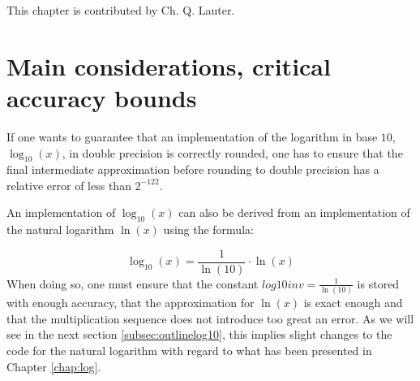 %
%
%
%


This chapter is contributed by Ch. Q. Lauter.

\section{Main considerations, critical accuracy bounds}\label{subsec:criticalboundslog10}
If one wants to guarantee that an implementation of the logarithm in
base $10$, $\log_{10}\left( x \right)$, in double precision is
correctly rounded, one has to ensure that the final intermediate
approximation before rounding to double precision has a relative error
of less than $2^{-122}$.

An implementation of $\log_{10}\left(x\right)$ can also be derived from an
implementation of the natural logarithm $\ln\left(x\right)$ using the formula:

\begin{equation}
  \log_{10}\left( x \right) = \frac{1}{\ln\left( 10 \right)} \cdot
\ln\left( x \right)\label{eq:log10}
\end{equation}
When doing so, one must ensure that the constant
$\mathit{log10inv} = \frac{1}{\ln\left(10\right)}$ is stored with
enough accuracy, that the approximation for $\ln\left( x \right)$ is
exact enough and that the multiplication sequence does not introduce 
too great an error. As we will see in the next section
\ref{subsec:outlinelog10}, this implies slight changes to the code for
the natural logarithm with regard to what has been presented in
 Chapter \ref{chap:log}.

